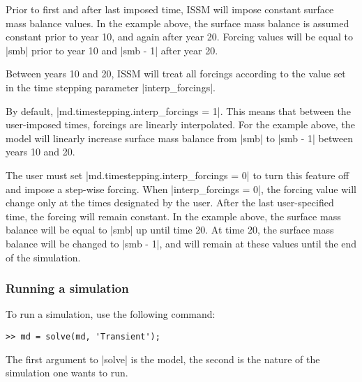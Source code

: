 Prior to first and after last imposed time, ISSM will impose constant surface mass balance values. In the example above, the surface mass balance is assumed constant prior to year 10, and again after year 20. Forcing values will be equal to \lstinlinebg|smb| prior to year 10 and \lstinlinebg|smb - 1| after year 20.

Between years 10 and 20, ISSM will treat all forcings according to the value set in the time stepping parameter \lstinlinebg|interp_forcings|.

By default, \lstinlinebg|md.timestepping.interp_forcings = 1|. This means that between the user-imposed times, forcings are linearly interpolated. For the example above, the model will linearly increase surface mass balance from \lstinlinebg|smb| to \lstinlinebg|smb - 1| between years 10 and 20.

The user must set \lstinlinebg|md.timestepping.interp_forcings = 0| to turn this feature off and impose a step-wise forcing. When \lstinlinebg|interp_forcings = 0|, the forcing value will change only at the times designated by the user. After the last user-specified time, the forcing will remain constant. In the example above, the surface mass balance will be equal to \lstinlinebg|smb| up until time 20. At time 20, the surface mass balance will be changed to \lstinlinebg|smb - 1|, and will remain at these values until the end of the simulation.

\subsubsection{Running a simulation}
To run a simulation, use the following command:
\begin{lstlisting}
>> md = solve(md, 'Transient');
\end{lstlisting}
The first argument to \lstinlinebg|solve| is the model, the second is the nature of the simulation one wants to run.

\clearpage %
